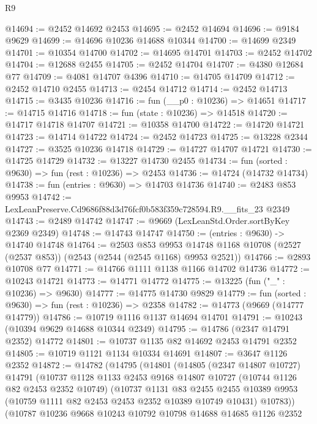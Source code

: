 \begin{lexlean}{R9}
\begin{coremodule}
@14694 := @2452 @14692 @2453
@14695 := @2452 @14694
@14696 := @9184 @9629
@14699 := @14696 @10236 @14688 @10344
@14700 := @14699 @2349
@14701 := @10354 @14700
@14702 := @14695 @14701
@14703 := @2452 @14702
@14704 := @12688 @2455
@14705 := @2452 @14704
@14707 := @4380 @12684 @77
@14709 := @4081 @14707 @4396
@14710 := @14705 @14709
@14712 := @2452 @14710 @2455
@14713 := @2454 @14712
@14714 := @2452 @14713
@14715 := @3435 @10236
@14716 := fun (__p0 : @10236) => @14651
@14717 := @14715 @14716
@14718 := fun (state : @10236) => @14518
@14720 := @14717 @14718 @14707
@14721 := @10358 @14700
@14722 := @14720 @14721
@14723 := @14714 @14722
@14724 := @2452 @14723
@14725 := @13228 @2344
@14727 := @3525 @10236 @14718
@14729 := @14727 @14707 @14721
@14730 := @14725 @14729
@14732 := @13227 @14730 @2455
@14734 := fun (sorted : @9630) => fun (rest : @10236) => @2453
@14736 := @14724 (@14732 @14734)
@14738 := fun (entries : @9630) => @14703 @14736
@14740 := @2483 @853 @9953
@14742 := LexLeanPreserve.Cd9686f88d3d76fcf0b583f359c728594.R9.__fits_23 @2349
@14743 := @2489 @14742
@14747 := @9669 (LexLeanStd.Order.sortByKey @2369 @2349)
@14748 := @14743 @14747
@14750 := (entries : @9630) -> @14740 @14748
@14764 := @2503
    @853
    @9953
    @14748
    @1168
    @10708
    (@2527 (@2537 @853))
    (@2543 (@2544 (@2545 @1168) @9953 @2521))
@14766 := @2893 @10708 @77
@14771 := @14766 @1111 @1138 @1166 @14702 @14736
@14772 := @10243 @14721
@14773 := @14771 @14772
@14775 := @13225 (fun ("_" : @10236) => @9630)
@14777 := @14775 @14730 @9829
@14779 := fun (sorted : @9630) => fun (rest : @10236) => @2358
@14782 := @14773 (@9669 (@14777 @14779))
@14786 := @10719 @1116 @1137 @14694 @14701
@14791 := @10243 (@10394 @9629 @14688 @10344 @2349)
@14795 := @14786 (@2347 @14791 @2352) @14772
@14801 := @10737 @1135 @82 @14692 @2453 @14791 @2352
@14805 := @10719 @1121 @1134 @10334 @14691
@14807 := @3647 @1126 @2352
@14872 := @14782
    (@14795
      (@14801
        (@14805
          (@2347 @14807 @10727)
          @14791
          (@10737
            @1128
            @1133
            @2453
            @9168
            @14807
            @10727
            (@10744 @1126 @82 @2453 @2352 @10749)
            (@10737
              @1131
              @83
              @2455
              @2455
              @10389
              @9953
              (@10759 @1111 @82 @2453 @2453 @2352 @10389 @10749 @10431)
              @10783))
          (@10787
            @10236
            @9668
            @10243
            @10792
            @10798
            @14688
            @14685
            @1126
            @2352

\end{coremodule}
\end{lexlean}
